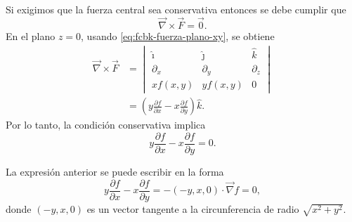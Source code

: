 \documentclass[../apunte_mecanica_clasica.tex]{subfiles}%
\begin{document}
Si exigimos que la fuerza central sea conservativa entonces se debe cumplir que
\begin{equation}
    \vec\nabla\times \vec F=\vec 0.
    \label{eq:fcbk-condicion-conservativa}
\end{equation}
En el plano $z=0$, usando \eqref{eq:fcbk-fuerza-plano-xy}, se obtiene
\begin{equation}
    \begin{aligned}
    \vec\nabla\times\vec F
    &=
    \begin{vmatrix}
    \hat{\imath} & \hat{\jmath} & \hat{k} \\
    \partial_x & \partial_y & \partial_z \\
    x f(x,y) & y f(x,y) & 0
    \end{vmatrix} \\
    &=\left(y\frac{\partial f}{\partial x}-x\frac{\partial f}{\partial y}\right)\hat{k}.
    \end{aligned}
    \label{eq:fcbk-racional-fuerza-central}
\end{equation}
Por lo tanto, la condición conservativa implica
\begin{equation}
    y\frac{\partial f}{\partial x}-x\frac{\partial f}{\partial y}=0.
    \label{eq:fcbk-condicion-fxy}
\end{equation}

La expresión anterior se puede escribir en la forma
\begin{equation}
    y\frac{\partial f}{\partial x}-x\frac{\partial f}{\partial y}
    =-(-y,x,0)\cdot \vec\nabla f =0,
    \label{eq:fcbk-vector-tangente-f}
\end{equation}
donde $(-y,x,0)$ es un vector tangente a la circunferencia de radio $\sqrt{x^2+y^2}$.
\end{document}
